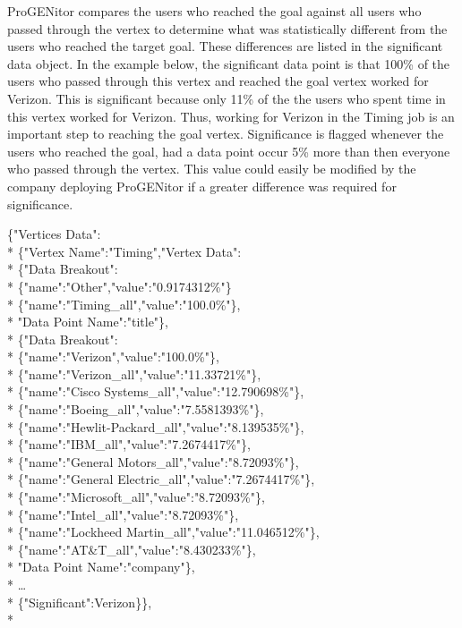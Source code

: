 ProGENitor compares the users who reached the goal against all users who passed
through the vertex to determine what was statistically different from the users
who reached the target goal.  These differences are listed in the significant
data object. In the example below, the significant data point is that 100\% of
the users who passed through this vertex and reached the goal vertex worked for
Verizon.  This is significant because only 11\% of the the users who spent time
in this vertex worked for Verizon.  Thus, working for Verizon in the Timing job is
an important step to reaching the goal vertex.  Significance is flagged whenever
the users who reached the goal, had a data point occur 5\% more than then
everyone who passed through the vertex.  This value could easily be modified by
the company deploying ProGENitor if a greater difference was required for significance.

\pagebreak
\begin{tt}
\begin{footnotesize}
\noindent \{"Vertices Data":\\*
	\indent \{"Vertex Name":"Timing","Vertex Data":\\*
		\indent \{"Data Breakout":\\*
		\indent \indent	\{"name":"Other","value":"0.9174312\%"\}\\*
		\indent	\indent \{"name":"Timing\_all","value":"100.0\%"\},\\*
		\indent	"Data Point Name":"title"\},\\*
		\indent\{"Data Breakout":\\*
		\indent	\indent	\{"name":"Verizon","value":"100.0\%"\},\\*
		\indent	\indent	\{"name":"Verizon\_all","value":"11.33721\%"\},\\*
		\indent	\indent	\{"name":"Cisco Systems\_all","value":"12.790698\%"\},\\*
		\indent	\indent	\{"name":"Boeing\_all","value":"7.5581393\%"\},\\*
		\indent	\indent	\{"name":"Hewlit-Packard\_all","value":"8.139535\%"\},\\*
		\indent	\indent	\{"name":"IBM\_all","value":"7.2674417\%"\},\\*
		\indent	\indent	\{"name":"General Motors\_all","value":"8.72093\%"\},\\*
		\indent	\indent	\{"name":"General Electric\_all","value":"7.2674417\%"\},\\*
		\indent	\indent	\{"name":"Microsoft\_all","value":"8.72093\%"\},\\*
		\indent	\indent	\{"name":"Intel\_all","value":"8.72093\%"\},\\*
		\indent	\indent	\{"name":"Lockheed Martin\_all","value":"11.046512\%"\},\\*
		\indent	\indent	\{"name":"AT\&T\_all","value":"8.430233\%"\},\\*
		\indent"Data Point Name":"company"\},\\*
		\indent\ldots\\*
		\indent \{"Significant":Verizon\}\},\\*
\end{footnotesize}
\end{tt}

